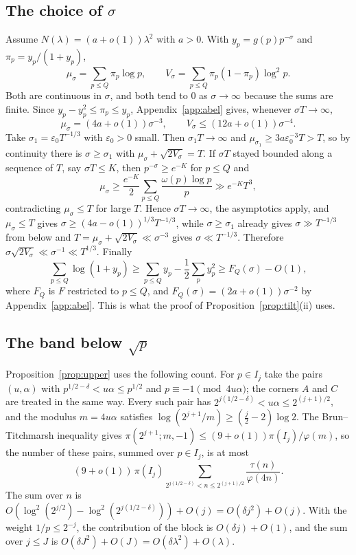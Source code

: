 \documentclass[aps,prd,twocolumn,superscriptaddress,nofootinbib,longbibliography,floatfix,showkeys,nobalancelastpage,amsmath,amssymb,10pt]{revtex4-2}
\theoremstyle{plain}
\theoremstyle{definition}
\theoremstyle{plain}
\newcommand{\eps}{\varepsilon}
\begin{document}
\subsection{The choice of \texorpdfstring{$\sigma$}{sigma}}\label{app:sigma}

Assume $N(\lambda)=(a+o(1))\lambda^2$ with $a>0$. With $y_p=g(p)p^{-\sigma}$ and $\pi_p=y_p/(1+y_p)$,
\[
\mu_\sigma=\sum_{p\le Q}\pi_p\log p,\qquad V_\sigma=\sum_{p\le Q}\pi_p(1-\pi_p)\log^2p.
\]
Both are continuous in $\sigma$, and both tend to $0$ as $\sigma\to\infty$ because the sums are finite. Since $y_p-y_p^2\le\pi_p\le y_p$, Appendix~\ref{app:abel} gives, whenever $\sigma T\to\infty$,
\[
\mu_\sigma=(4a+o(1))\sigma^{-3},\qquad V_\sigma\le(12a+o(1))\sigma^{-4}.
\]
Take $\sigma_1=\eps_0T^{-1/3}$ with $\eps_0>0$ small. Then $\sigma_1T\to\infty$ and $\mu_{\sigma_1}\ge3a\eps_0^{-3}T>T$, so by continuity there is $\sigma\ge\sigma_1$ with $\mu_\sigma+\sqrt{2V_\sigma}=T$. If $\sigma T$ stayed bounded along a sequence of $T$, say $\sigma T\le K$, then $p^{-\sigma}\ge e^{-K}$ for $p\le Q$ and
\[
\mu_\sigma\ge\frac{e^{-K}}2\sum_{p\le Q}\frac{\omega(p)\log p}p\gg e^{-K}T^3,
\]
contradicting $\mu_\sigma\le T$ for large $T$. Hence $\sigma T\to\infty$, the asymptotics apply, and $\mu_\sigma\le T$ gives $\sigma\ge(4a-o(1))^{1/3}T^{-1/3}$, while $\sigma\ge\sigma_1$ already gives $\sigma\gg T^{-1/3}$ from below and $T=\mu_\sigma+\sqrt{2V_\sigma}\ll\sigma^{-3}$ gives $\sigma\ll T^{-1/3}$. Therefore $\sigma\sqrt{2V_\sigma}\ll\sigma^{-1}\ll T^{1/3}$. Finally
\[
\sum_{p\le Q}\log(1+y_p)\ge\sum_{p\le Q}y_p-\frac12\sum_py_p^2\ge F_Q(\sigma)-O(1),
\]
where $F_Q$ is $F$ restricted to $p\le Q$, and $F_Q(\sigma)=(2a+o(1))\sigma^{-2}$ by Appendix~\ref{app:abel}. This is what the proof of Proposition~\ref{prop:tilt}(ii) uses.

\subsection{The band below \texorpdfstring{$\sqrt p$}{sqrt p}}\label{app:band}

Proposition~\ref{prop:upper} uses the following count. For $p\in I_j$ take the pairs $(u,\alpha)$ with $p^{1/2-\delta}<u\alpha\le p^{1/2}$ and $p\equiv-1\pmod{4u\alpha}$; the corners $A$ and $C$ are treated in the same way. Every such pair has $2^{j(1/2-\delta)}<u\alpha\le2^{(j+1)/2}$, and the modulus $m=4u\alpha$ satisfies $\log(2^{j+1}/m)\ge(\frac j2-2)\log2$. The Brun--Titchmarsh inequality gives $\pi(2^{j+1};m,-1)\le(9+o(1))\pi(I_j)/\varphi(m)$, so the number of these pairs, summed over $p\in I_j$, is at most
\[
(9+o(1))\,\pi(I_j)\sum_{2^{j(1/2-\delta)}<n\le2^{(j+1)/2}}\frac{\tau(n)}{\varphi(4n)}.
\]
The sum over $n$ is $O(\log^2(2^{j/2})-\log^2(2^{j(1/2-\delta)}))+O(j)=O(\delta j^2)+O(j)$. With the weight $1/p\le2^{-j}$, the contribution of the block is $O(\delta j)+O(1)$, and the sum over $j\le J$ is $O(\delta J^2)+O(J)=O(\delta\lambda^2)+O(\lambda)$.
\end{document}
